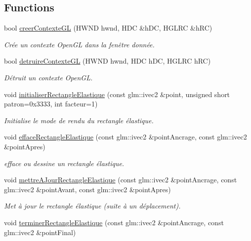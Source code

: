 \subsection*{Functions}
\begin{DoxyCompactItemize}
\item 
bool \hyperlink{namespaceaidegl_a465185be937173fdd623eb88949b212c}{creer\+Contexte\+G\+L} (H\+W\+N\+D hwnd, H\+D\+C \&h\+D\+C, H\+G\+L\+R\+C \&h\+R\+C)
\begin{DoxyCompactList}\small\item\em Crée un contexte Open\+G\+L dans la fenêtre donnée. \end{DoxyCompactList}\item 
bool \hyperlink{namespaceaidegl_a0cb31f11533480a059574970f5fcff6b}{detruire\+Contexte\+G\+L} (H\+W\+N\+D hwnd, H\+D\+C h\+D\+C, H\+G\+L\+R\+C h\+R\+C)
\begin{DoxyCompactList}\small\item\em Détruit un contexte Open\+G\+L. \end{DoxyCompactList}\item 
void \hyperlink{namespaceaidegl_a0680ab3e3bddc4c7b123c46117e31094}{initialiser\+Rectangle\+Elastique} (const glm\+::ivec2 \&point, unsigned short patron=0x3333, int facteur=1)
\begin{DoxyCompactList}\small\item\em Initialise le mode de rendu du rectangle élastique. \end{DoxyCompactList}\item 
void \hyperlink{namespaceaidegl_aeda079ddf58dff9c4ceb7b1dc756439b}{efface\+Rectangle\+Elastique} (const glm\+::ivec2 \&point\+Ancrage, const glm\+::ivec2 \&point\+Apres)
\begin{DoxyCompactList}\small\item\em efface ou dessine un rectangle élastique. \end{DoxyCompactList}\item 
void \hyperlink{namespaceaidegl_a900742dca102d07d9ae7efd8a5e0cce8}{mettre\+A\+Jour\+Rectangle\+Elastique} (const glm\+::ivec2 \&point\+Ancrage, const glm\+::ivec2 \&point\+Avant, const glm\+::ivec2 \&point\+Apres)
\begin{DoxyCompactList}\small\item\em Met à jour le rectangle élastique (suite à un déplacement). \end{DoxyCompactList}\item 
void \hyperlink{namespaceaidegl_a023f37325ede13a1f60243382cc11b12}{terminer\+Rectangle\+Elastique} (const glm\+::ivec2 \&point\+Ancrage, const glm\+::ivec2 \&point\+Final)

\end{DoxyCompactItemize}
